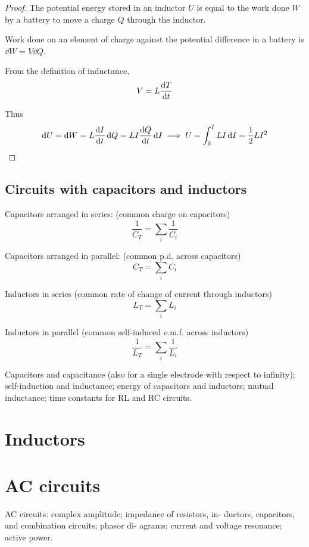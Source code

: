 \begin{proof}
The potential energy stored in an inductor $U$ is equal to the work done $W$ by a battery to move a charge $Q$ through the inductor.

Work done on an element of charge against the potential difference in a battery is $\dd{W} = V \dd{Q}$.

From the definition of inductance, \[ V = L \dv{T}{t} \]

Thus 
\[ \dd{U} = \dd{W} = L\dv{I}{t}\dd{Q} = LI\dv{Q}{t} \dd{I} \implies U = \int_0^I LI \dd{I} = \frac{1}{2}LI^2 \]
\end{proof}


\section{Circuits with capacitors and inductors}
Capacitors arranged in series: (common charge on capacitors)
\[ \frac{1}{C_T} = \sum_i\frac{1}{C_i} \]

Capacitors arranged in parallel: (common p.d. across capacitors)
\[ C_T = \sum_iC_i \]

Inductors in series (common rate of change of current through inductors)
\[ L_T = \sum_iL_i \]

Inductors in parallel (common self-induced e.m.f. across inductors)
\[ \frac{1}{L_T} = \sum_i\frac{1}{L_i} \]





Capacitors and capacitance (also for a single electrode with respect to infinity); self-induction and inductance; energy of capacitors and inductors; mutual inductance; time constants for RL and RC circuits. 

\chapter{Inductors}


\chapter{AC circuits}
AC
circuits: complex amplitude; impedance of resistors, in-
ductors, capacitors, and combination circuits; phasor di-
agrams; current and voltage resonance; active power.

